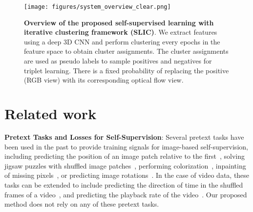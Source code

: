 \documentclass[10pt,twocolumn,letterpaper]{article}
\begin{document}
\begin{figure*}
    \vspace{0.15cm}
	\centering
	
	\texttt{[image: figures/system\_overview\_clear.png]}
	\caption{\textbf{Overview of the proposed self-supervised learning with iterative clustering framework (SLIC)}. We extract features using a deep 3D CNN and perform clustering every  epochs in the feature space to obtain cluster assignments. The cluster assignments are used as pseudo labels to sample positives and negatives for triplet learning. There is a fixed probability of replacing the positive (RGB view) with its corresponding optical flow view. }
	\label{fig:architecture}
	\vspace{-0.5cm}
\end{figure*} 




\section{Related work}
\vspace{-0.1cm}

\label{related work}
\textbf{Pretext Tasks and Losses for Self-Supervision}:
Several pretext tasks have been used in the past to provide training signals for image-based self-supervision, including predicting the position of an image patch relative to the first~\cite{doersch2015unsupervised}, solving jigsaw puzzles with shuffled image patches~\cite{Noroozi2016UnsupervisedLO}, performing colorization~\cite{zhang2016colorful, vondrick2018tracking, 8237488}, inpainting of missing pixels~\cite{pathakCVPR16context}, or predicting image rotations~\cite{gidaris2018unsupervised}. In the case of video data, these tasks can be extended to include predicting the direction of time in the shuffled frames of a video~\cite{wei2018learning}, and predicting the playback rate of the video~\cite{yao2020video, Benaim_2020_CVPR, Wang20}. Our proposed method does not rely on any of these pretext tasks. 
\end{document}
